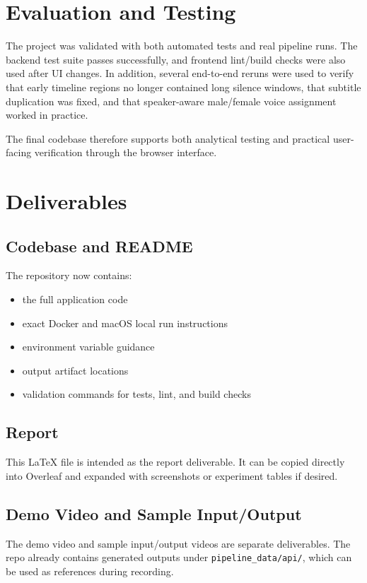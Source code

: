 \documentclass[11pt]{article}
\begin{document}
\section{Evaluation and Testing}
The project was validated with both automated tests and real pipeline runs.
The backend test suite passes successfully, and frontend lint/build checks were
also used after UI changes. In addition, several end-to-end reruns were used to
verify that early timeline regions no longer contained long silence windows,
that subtitle duplication was fixed, and that speaker-aware male/female voice
assignment worked in practice.

The final codebase therefore supports both analytical testing and practical
user-facing verification through the browser interface.

\section{Deliverables}
\subsection{Codebase and README}
The repository now contains:
\begin{itemize}[leftmargin=*]
\item the full application code
\item exact Docker and macOS local run instructions
\item environment variable guidance
\item output artifact locations
\item validation commands for tests, lint, and build checks
\end{itemize}

\subsection{Report}
This LaTeX file is intended as the report deliverable. It can be copied
directly into Overleaf and expanded with screenshots or experiment tables if
desired.

\subsection{Demo Video and Sample Input/Output}
The demo video and sample input/output videos are separate deliverables. The
repo already contains generated outputs under \texttt{pipeline\_data/api/},
which can be used as references during recording.
\end{document}
